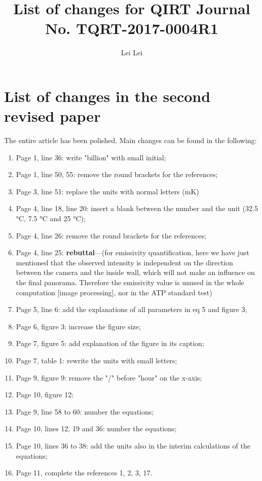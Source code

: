 \documentclass{article}
\begin{document}
    
\title{List of changes for QIRT Journal No. TQRT-2017-0004R1}
\author{Lei Lei}

\maketitle

\section{List of changes in the second revised paper} %
The entire article has been polished. Main changes can be found in the following:
\begin{enumerate}
    \item Page 1, line 36: write "billion" with small initial; 
    \item Page 1, line 50, 55: remove the round brackets for the references;
    \item Page 3, line 51: replace the units with normal letters (mK)
    \item Page 4, line 18, line 20: insert a blank between the number and the unit (32.5 °C, 7.5 °C and 25 °C);
    \item Page 4, line 26: remove the round brackets for the references;
    \item Page 4, line 25: \textbf{rebuttal}---(for emissivity quantification, here we have just mentioned that the observed intensity is independent on the direction between the camera and the inside wall, which will not make an influence on the final panorama. Therefore the emissivity value is unused in the whole computation [image processing], nor in the ATP standard test)
    \item Page 5, line 6: add the explanations of all parameters in eq 5 and figure 3;
    \item Page 6, figure 3: increase the figure size;
    \item Page 7, figure 5: add explanation of the figure in its caption;
    \item Page 7, table 1: rewrite the units with small letters;
    \item Page 9, figure 9: remove the "/" before "hour" on the x-axis;
    \item Page 10, figure 12: 
    \item Page 9, line 58 to 60: number the equations;
    \item Page 10, lines 12, 19 and 36: number the equations;
    \item Page 10, lines 36 to 38: add the units also in the interim calculations of the equations;
    \item Page 11, complete the references 1, 2, 3, 17.
\end{enumerate}
\end{document}
